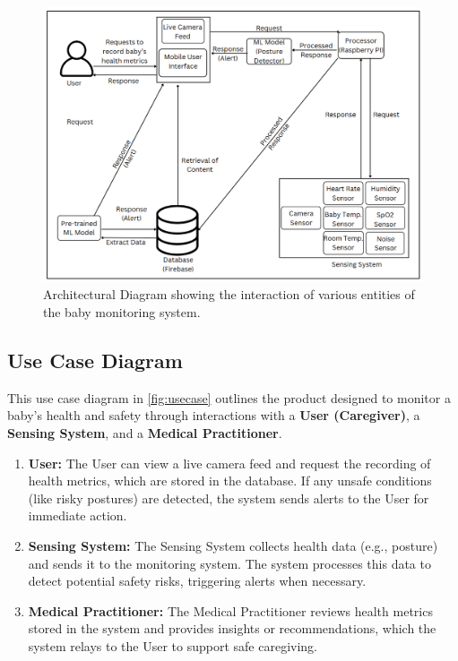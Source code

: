\documentclass[12pt,a4paper]{report}
\begin{document}
\begin{figure}[H]
  \centering
  \includegraphics[scale=0.55]{./pic/finarch.png}
  \caption{Architectural Diagram showing the interaction of various entities of the baby monitoring system.}
  \label{fig:architecture}
\end{figure}
\subsection{Use Case Diagram}

This use case diagram in \ref{fig:usecase} outlines the product designed to monitor a baby’s health and safety through interactions with a \textbf{User (Caregiver)}, a \textbf{Sensing System}, and a \textbf{Medical Practitioner}.

\begin{enumerate}
    \item \textbf{User:} The User can view a live camera feed and request the recording of health metrics, which are stored in the database. If any unsafe conditions (like risky postures) are detected, the system sends alerts to the User for immediate action.
    
    \item \textbf{Sensing System:} The Sensing System collects health data (e.g., posture) and sends it to the monitoring system. The system processes this data to detect potential safety risks, triggering alerts when necessary.
    
    \item \textbf{Medical Practitioner:} The Medical Practitioner reviews health metrics stored in the system and provides insights or recommendations, which the system relays to the User to support safe caregiving.
\end{enumerate}
\end{document}
